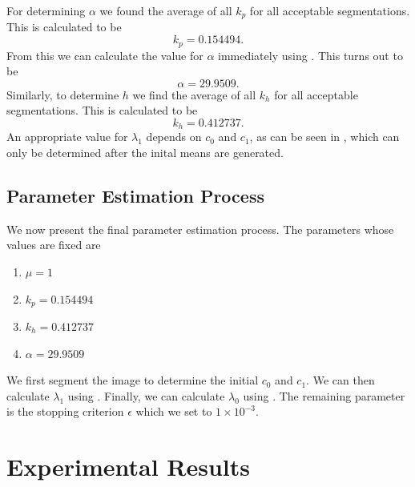 \documentclass[10pt, journal, letterpaper, onecolumn, draftcls]{IEEEtran}
\begin{document}

For determining $\alpha$ we found the average of all $k_p$ for all acceptable segmentations. This is calculated to be
\begin{equation*}
	k_p = 0.154494.
\end{equation*}
From this we can calculate the value for $\alpha$ immediately using . This turns out to be
\begin{equation}
	\alpha = 29.9509.
\end{equation}
Similarly, to determine $h$ we find the average of all $k_h$ for all acceptable segmentations. This is calculated to be
\begin{equation*}
	k_h = 0.412737.
\end{equation*}
An appropriate value for $\lambda_1$ depends on $c_0$ and $c_1$, as can be seen in , which can only be determined after the inital means are generated.

\subsection{Parameter Estimation Process}
We now present the final parameter estimation process. The parameters whose values are fixed are
\begin{enumerate}
	\item $\mu=1$
	\item $k_p = 0.154494$
	\item $k_h = 0.412737$
	\item $\alpha = 29.9509$
\end{enumerate}
We first segment the image to determine the initial $c_0$ and $c_1$. We can then calculate $\lambda_1$ using . Finally, we can calculate $\lambda_0$ using .
The remaining parameter is the stopping criterion $\epsilon$ which we set to  $1 \times 10^{-3}$.

\section{Experimental Results}
\end{document}
